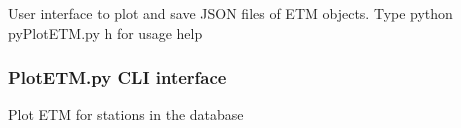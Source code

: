 \documentclass[letterpaper,10pt,english]{sphinxmanual}
\begin{document}
\sphinxAtStartPar
User interface to plot and save JSON files of ETM objects.
Type python pyPlotETM.py \sphinxhyphen{}h for usage help

\begin{fulllineitems}
\label{\detokenize{com:com.PlotETM.from_file}}
\pysigstartsignatures
{}
\pysigstopsignatures
\end{fulllineitems}


\begin{fulllineitems}
\label{\detokenize{com:com.PlotETM.main}}
\pysigstartsignatures
{}
\pysigstopsignatures
\end{fulllineitems}



\subsubsection{PlotETM.py \sphinxhyphen{} CLI interface}
\label{\detokenize{com:PlotETM.py---CLI-interface}}
\sphinxAtStartPar
Plot ETM for stations in the database
\end{document}
